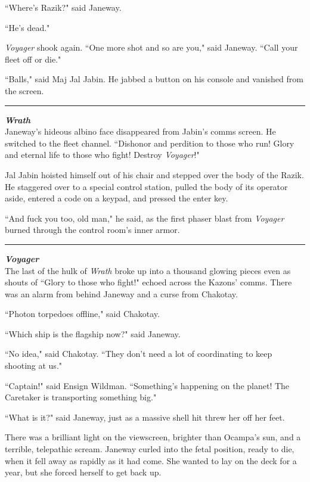 \documentclass[twoside,letterpaper,12pt]{memoir}
\begin{document}
``Where's Razik?" said Janeway. 

``He's dead." 

\textit{Voyager }shook again. ``One more shot and so are you," said Janeway. ``Call your fleet off or die." 

``Balls," said Maj Jal Jabin. He jabbed a button on his console and vanished from the screen. 

\begin{center}\rule{3cm}{0.4 pt}\end{center} 

\noindent\textit{\textbf{Wrath}}\\

Janeway's hideous albino face disappeared from Jabin's comms screen. He switched to the fleet channel. ``Dishonor and perdition to those who run! Glory and eternal life to those who fight! Destroy \textit{Voyager}!" 

Jal Jabin hoisted himself out of his chair and stepped over the body of the Razik. He staggered over to a special control station, pulled the body of its operator aside, entered a code on a keypad, and pressed the enter key. 

``And fuck you too, old man," he said, as the first phaser blast from \textit{Voyager} burned through the control room's inner armor. 

\begin{center}\rule{3cm}{0.4 pt}\end{center} 

\noindent\textit{\textbf{Voyager}}\\

The last of the hulk of \textit{Wrath} broke up into a thousand glowing pieces even as shouts of ``Glory to those who fight!" echoed across the Kazons' comms. There was an alarm from behind Janeway and a curse from Chakotay. 

``Photon torpedoes offline," said Chakotay. 

``Which ship is the flagship now?" said Janeway. 

``No idea," said Chakotay. ``They don't need a lot of coordinating to keep shooting at us." 

``Captain!" said Ensign Wildman. ``Something's happening on the planet! The Caretaker is transporting something big." 

``What is it?" said Janeway, just as a massive shell hit threw her off her feet. 

There was a brilliant light on the viewscreen, brighter than Ocampa's sun, and a terrible, telepathic scream. Janeway curled into the fetal position, ready to die, when it fell away as rapidly as it had come. She wanted to lay on the deck for a year, but she forced herself to get back up. 
\end{document}
